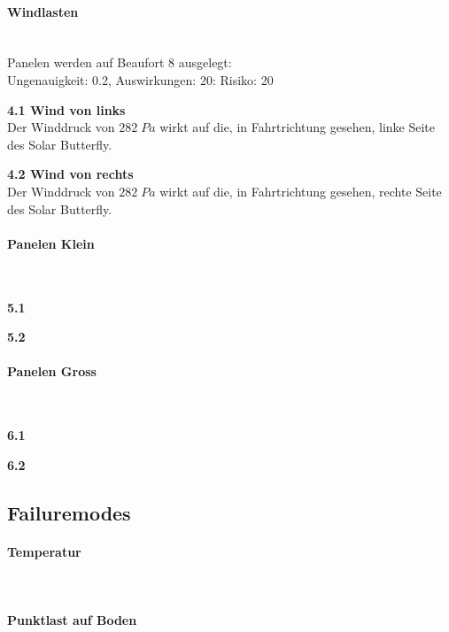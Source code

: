 \paragraph{Windlasten}\mbox{}\\
Panelen werden auf Beaufort 8 ausgelegt:\\
Ungenauigkeit: 0.2, Auswirkungen: 20: Risiko: 20
\begin{description}
  \item \textbf{4.1 Wind von links}\\ Der Winddruck von $282 \; Pa$ wirkt auf die, in Fahrtrichtung gesehen, linke Seite des Solar Butterfly.
  \item \textbf{4.2 Wind von rechts}\\ Der Winddruck von $282 \; Pa$ wirkt auf die, in Fahrtrichtung gesehen, rechte Seite des Solar Butterfly.
\end{description}


\paragraph{Panelen Klein}\mbox{}\\
\begin{description}
  \item \textbf{5.1 }\\
  \item \textbf{5.2 }\\
\end{description}

\paragraph{Panelen Gross}\mbox{}\\
\begin{description}
  \item \textbf{6.1 }\\
  \item \textbf{6.2 }\\
\end{description}


\subsection{Failuremodes}
\paragraph{Temperatur}\mbox{}\\
\paragraph{Punktlast auf Boden}\mbox{}\\


